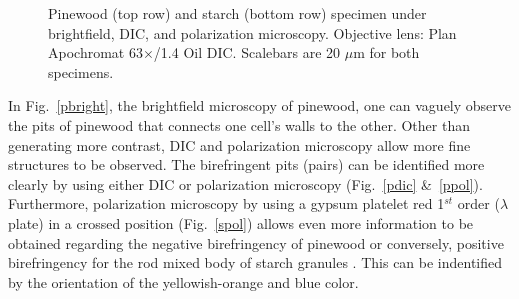\begin{figure}[ht]
 \hspace{0.1mm}
\caption[Left: brightfield, middle: dic, right: polar.]{Pinewood (top row) and starch (bottom row) specimen under brightfield, DIC, and polarization microscopy. 
Objective lens: Plan Apochromat 63$\times$/1.4 Oil DIC. 
Scalebars are 20 $\mu$m for both specimens.} 
\label{fig:pinestar}
\end{figure}

In Fig.~\ref{pbright}, the brightfield microscopy of pinewood, one can vaguely observe the pits of pinewood that connects one cell's walls to the other. 
Other than generating more contrast, DIC and polarization microscopy allow more fine structures to be observed. 
The birefringent pits (pairs) can be identified more clearly by using either DIC or polarization microscopy (Fig.~\ref{pdic} \&~\ref{ppol}). 
Furthermore, polarization microscopy by using a gypsum platelet red 1$^{st}$ order ($\lambda$ plate) in a crossed position (Fig.~\ref{spol}) allows even more information to be obtained regarding the negative birefringency of pinewood or conversely, positive birefringency for the rod mixed body of starch granules \cite{Lect08}. 
This can be indentified by the orientation of the yellowish-orange and blue color.



\renewcommand{\refname}{\spacedlowsmallcaps{References}} %

%



